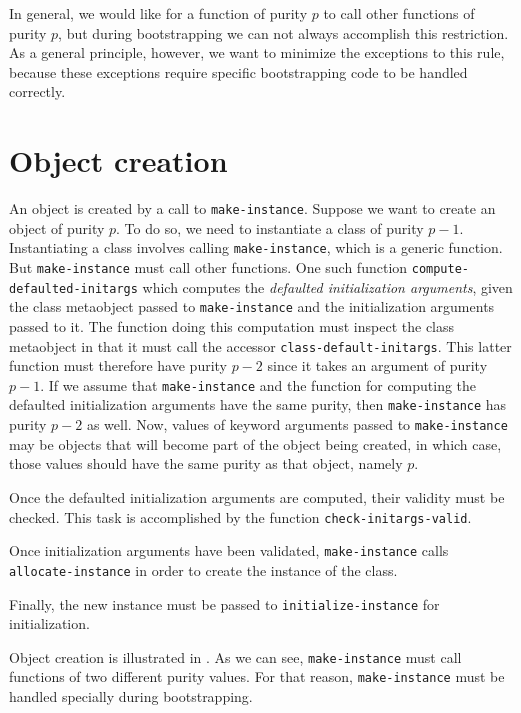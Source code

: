 In general, we would like for a function of purity $p$ to call other
functions of purity $p$, but during bootstrapping we can not always
accomplish this restriction.  As a general principle, however, we want
to minimize the exceptions to this rule, because these exceptions
require specific bootstrapping code to be handled correctly.

\section{Object creation}
\label{sec-app-bootstrapping-object-allocation}

An object is created by a call to \texttt{make-instance}.
Suppose we want to create an object of purity $p$.  To do so, we
need to instantiate a class of purity $p-1$.  Instantiating a class
involves calling \texttt{make-instance}, which is a generic
function.  But \texttt{make-instance} must call other functions.  One
such function \texttt{compute-defaulted-initargs} which
computes the \emph{defaulted initialization arguments},
given the class metaobject passed to \texttt{make-instance} and the
initialization arguments passed to it.  The function doing this
computation must inspect the class metaobject in that it must call the
accessor \texttt{class-default-initargs}.  This latter function must
therefore have purity $p-2$ since it takes an argument of purity
$p-1$.  If we assume that \texttt{make-instance} and the function for
computing the defaulted initialization arguments have the same purity,
then \texttt{make-instance} has purity $p-2$ as well.  Now, values of
keyword arguments passed to \texttt{make-instance} may be objects that
will become part of the object being created, in which case, those
values should have the same purity as that object, namely $p$.

Once the defaulted initialization arguments are computed, their
validity must be checked.  This task is accomplished by the function
\texttt{check-initargs-valid}.

Once initialization arguments have been validated,
\texttt{make-instance} calls \texttt{allocate-instance} in order to
create the instance of the class.

Finally, the new instance must be passed to
\texttt{initialize-instance} for initialization.

Object creation is illustrated in .  As we
can see, \texttt{make-instance} must call functions of two different
purity values.  For that reason, \texttt{make-instance} must be
handled specially during bootstrapping.

